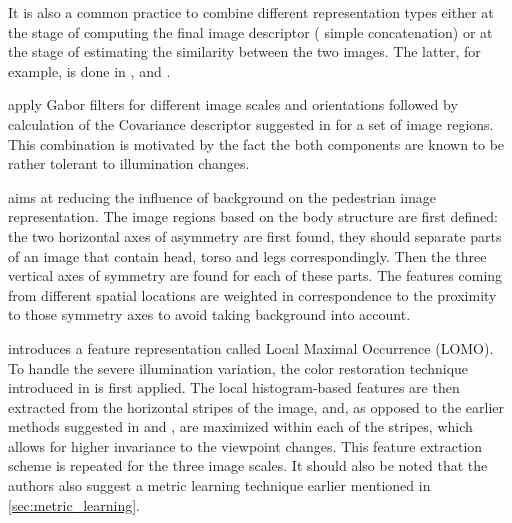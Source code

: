 It is also a common practice to combine different representation types either at the stage of computing the final image descriptor (\eg{} simple concatenation) or at the stage of estimating the similarity between the two images. The latter, for example, is done in \citep{DBLP:journals/cviu/BazzaniCM13}, \citep{ma2012local} and \citep{ma2012bicov}. 





\citep{ma2012bicov} apply Gabor filters for different image scales and orientations followed by calculation of the Covariance descriptor suggested in \citep{tuzel2008pedestrian} for a set of image regions. This combination is motivated by the fact the both components are known to be rather tolerant to illumination changes.

\citep{DBLP:journals/cviu/BazzaniCM13} aims at reducing the influence of background on the pedestrian image representation. The image regions based on the body structure are first defined: the two  horizontal axes of asymmetry are first found, they should separate parts of an image that contain head, torso and legs correspondingly. Then the three vertical axes of symmetry are found for each of these parts. The features coming from different spatial locations are weighted in correspondence to the proximity to those symmetry axes to avoid taking background into account. 


\citep{liao2015person} introduces a feature representation called Local Maximal Occurrence (LOMO). To handle the severe illumination variation, the color restoration technique introduced in \citep{JobsonRW97a} is first applied.  The local histogram-based features are then extracted from the horizontal stripes of the image, and, as opposed to the earlier methods suggested in \citep{zheng2011person} and \citep{prosser2010person}, are maximized within each of the stripes, which allows for higher invariance to the viewpoint changes. This feature extraction scheme is repeated for the three image scales. It should also be noted that the authors also suggest a metric learning technique earlier mentioned in \ref{sec:metric_learning}. 


